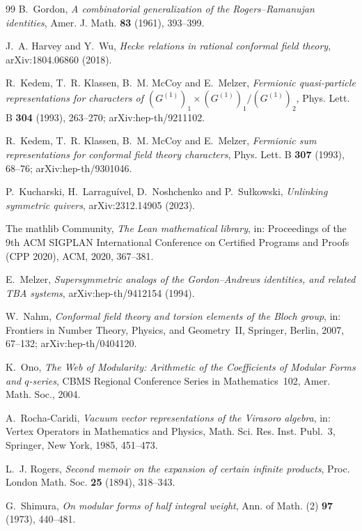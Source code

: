 \documentclass[11pt]{amsart}
\theoremstyle{definition}
\numberwithin{equation}{section}
\begin{document}
\begin{thebibliography}{99}
 B.~Gordon, \emph{A combinatorial generalization of the Rogers--Ramanujan identities},
Amer. J. Math. \textbf{83} (1961), 393--399.

 J.~A. Harvey and Y.~Wu, \emph{Hecke relations in rational conformal field theory},
arXiv:1804.06860 (2018).

 R.~Kedem, T.~R. Klassen, B.~M. McCoy and E.~Melzer, \emph{Fermionic quasi-particle
representations for characters of $(G^{(1)})_1\times(G^{(1)})_1/(G^{(1)})_2$}, Phys. Lett. B \textbf{304}
(1993), 263--270; arXiv:hep-th/9211102.

 R.~Kedem, T.~R. Klassen, B.~M. McCoy and E.~Melzer, \emph{Fermionic sum representations for
conformal field theory characters}, Phys. Lett. B \textbf{307} (1993), 68--76; arXiv:hep-th/9301046.

 P.~Kucharski, H.~Larragu\'ivel, D.~Noshchenko and P.~Su\l kowski, \emph{Unlinking symmetric
quivers}, arXiv:2312.14905 (2023).

 The mathlib Community, \emph{The Lean mathematical library}, in: Proceedings of the 9th
ACM SIGPLAN International Conference on Certified Programs and Proofs (CPP 2020), ACM, 2020, 367--381.

 E.~Melzer, \emph{Supersymmetric analogs of the Gordon--Andrews identities, and related
TBA systems}, arXiv:hep-th/9412154 (1994).

 W.~Nahm, \emph{Conformal field theory and torsion elements of the Bloch group}, in:
Frontiers in Number Theory, Physics, and Geometry~II, Springer, Berlin, 2007, 67--132;
arXiv:hep-th/0404120.

 K.~Ono, \emph{The Web of Modularity: Arithmetic of the Coefficients of Modular Forms and
$q$-series}, CBMS Regional Conference Series in Mathematics~102, Amer. Math. Soc., 2004.

 A.~Rocha-Caridi, \emph{Vacuum vector representations of the Virasoro algebra}, in: Vertex
Operators in Mathematics and Physics, Math. Sci. Res. Inst. Publ.~3, Springer, New York, 1985, 451--473.

 L.~J. Rogers, \emph{Second memoir on the expansion of certain infinite products}, Proc.
London Math. Soc. \textbf{25} (1894), 318--343.

 G.~Shimura, \emph{On modular forms of half integral weight}, Ann. of Math. (2)
\textbf{97} (1973), 440--481.


\end{thebibliography}
\end{document}
